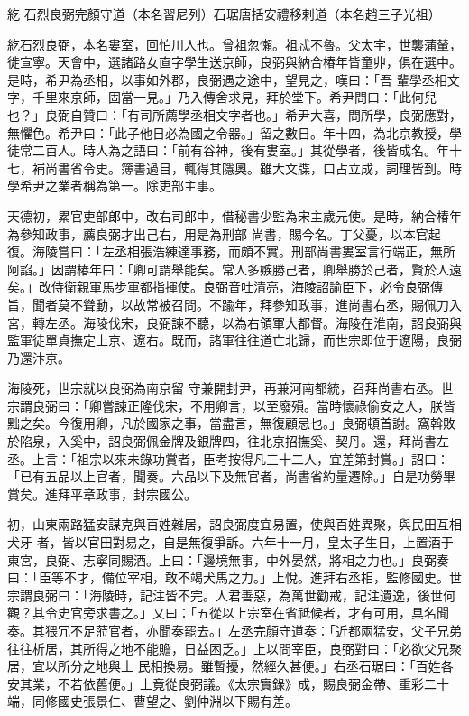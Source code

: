 
\begin{pinyinscope}

 紇
 石烈良弼完顏守道（本名習尼列）石琚唐括安禮移剌道（本名趙三子光祖）



 紇石烈良弼，本名婁室，回怕川人也。曾祖忽懶。祖忒不魯。父太宇，世襲蒲輦，徙宣寧。天會中，選諸路女直字學生送京師，良弼與納合椿年皆童丱，俱在選中。是時，希尹為丞相，以事如外郡，良弼遇之途中，望見之，嘆曰：「吾
 輩學丞相文字，千里來京師，固當一見。」乃入傳舍求見，拜於堂下。希尹問曰：「此何兒也？」良弼自贊曰：「有司所薦學丞相文字者也。」希尹大喜，問所學，良弼應對，無懼色。希尹曰：「此子他日必為國之令器。」留之數日。年十四，為北京教授，學徒常二百人。時人為之語曰：「前有谷神，後有婁室。」其從學者，後皆成名。年十七，補尚書省令史。簿書過目，輒得其隱奧。雖大文牒，口占立成，詞理皆到。時學希尹之業者稱為第一。除吏部主事。



 天德初，累官吏部郎中，改右司郎中，借秘書少監為宋主歲元使。是時，納合椿年為參知政事，薦良弼才出己右，用是為刑部
 尚書，賜今名。丁父憂，以本官起復。海陵嘗曰：「左丞相張浩練達事務，而頗不實。刑部尚書婁室言行端正，無所阿諂。」因謂椿年曰：「卿可謂舉能矣。常人多嫉勝己者，卿舉勝於己者，賢於人遠矣。」改侍衛親軍馬步軍都指揮使。良弼音吐清亮，海陵詔諭臣下，必令良弼傳旨，聞者莫不聳動，以故常被召問。不踰年，拜參知政事，進尚書右丞，賜佩刀入宮，轉左丞。海陵伐宋，良弼諫不聽，以為右領軍大都督。海陵在淮南，詔良弼與監軍徒單貞撫定上京、遼右。既而，諸軍往往道亡北歸，而世宗即位于遼陽，良弼乃還汴京。



 海陵死，世宗就以良弼為南京留
 守兼開封尹，再兼河南都統，召拜尚書右丞。世宗謂良弼曰：「卿嘗諫正隆伐宋，不用卿言，以至廢殞。當時懷祿偷安之人，朕皆黜之矣。今復用卿，凡於國家之事，當盡言，無復顧忌也。」良弼頓首謝。窩斡敗於陷泉，入奚中，詔良弼佩金牌及銀牌四，往北京招撫奚、契丹。還，拜尚書左丞。上言：「祖宗以來未錄功賞者，臣考按得凡三十二人，宜差第封賞。」詔曰：「已有五品以上官者，聞奏。六品以下及無官者，尚書省約量遷除。」自是功勞畢賞矣。進拜平章政事，封宗國公。



 初，山東兩路猛安謀克與百姓雜居，詔良弼度宜易置，使與百姓異聚，與民田互相犬牙
 者，皆以官田對易之，自是無復爭訴。六年十一月，皇太子生日，上置酒于東宮，良弼、志寧同賜酒。上曰：「邊境無事，中外晏然，將相之力也。」良弼奏曰：「臣等不才，備位宰相，敢不竭犬馬之力。」上悅。進拜右丞相，監修國史。世宗謂良弼曰：「海陵時，記注皆不完。人君善惡，為萬世勸戒，記注遺逸，後世何觀？其令史官旁求書之。」又曰：「五從以上宗室在省祗候者，才有可用，具名聞奏。其猥冗不足蒞官者，亦聞奏罷去。」左丞完顏守道奏：「近都兩猛安，父子兄弟往往析居，其所得之地不能贍，日益困乏。」上以問宰臣，良弼對曰：「必欲父兄聚居，宜以所分之地與土
 民相換易。雖暫擾，然經久甚便。」右丞石琚曰：「百姓各安其業，不若依舊便。」上竟從良弼議。《太宗實錄》成，賜良弼金帶、重彩二十端，同修國史張景仁、曹望之、劉仲淵以下賜有差。




\end{pinyinscope}
